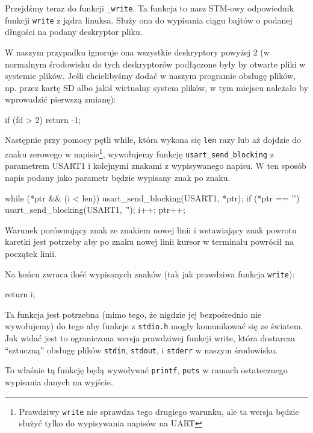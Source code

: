 \documentclass{pdfBooklets}
\begin{document}
Przejdźmy teraz do funkcji \Verb$_write$. Ta funkcja to nasz STM-owy odpowiednik funkcji \Verb$write$ z jądra linuksa. Służy ona do wypisania ciągu
bajtów o podanej długości na podany deskryptor pliku.

W naszym przypadku ignoruje ona wszystkie deskryptory powyżej 2 (w normalnym środowisku do tych deskryptorów podłączone były by otwarte pliki w systemie
plików. Jeśli chcielibyśmy dodać w naszym programie obsługę plików, np. przez kartę SD albo jakiś wirtualny system plików, w tym miejscu
należało by wprowadzić pierwszą zmianę):

\begin{CodeFrame*}[c]{}
  if (fd > 2) {
    return -1;
  }
\end{CodeFrame*}

Następnie przy pomocy pętli while, która wykona się \Verb$len$ razy lub aż dojdzie do znaku zerowego w napisie\footnote{Prawdziwy \Verb$write$ nie
  sprawdza tego drugiego warunku, ale ta wersja będzie służyć tylko do wypisywania napisów na UART}, wywołujemy funkcję \Verb$usart_send_blocking$
z parametrem USART1 i kolejnymi znakami z wypisywanego napisu. W ten sposób napis podany jako parametr będzie wypisany znak po znaku.

\begin{CodeFrame*}[c]{}
  while (*ptr && (i < len)) {
    usart_send_blocking(USART1, *ptr);
    if (*ptr == '\n') {
      usart_send_blocking(USART1, '\r');
    }
    i++; 
    ptr++;
  }
\end{CodeFrame*}

Warunek porównujący znak ze znakiem nowej linii i wstawiający znak powrotu karetki jest potrzeby aby po znaku nowej linii kursor w terminalu powrócił
na początek linii.

Na końcu zwraca ilość wypisanych znaków (tak jak prawdziwa funkcja \Verb$write$):

\begin{CodeFrame*}[c]{}
  return i;
\end{CodeFrame*}

Ta funkcja jest potrzebna (mimo tego, że nigdzie jej bezpośrednio nie wywołujemy) do tego aby funkcje z \Verb$stdio.h$ mogły komunikować się ze światem.
Jak widać jest to ograniczona wersja prawdziwej funkcji write, która dostarcza ``sztuczną'' obsługę plików \Verb$stdin$, \Verb$stdout$, i \Verb$stderr$
w naszym środowisku. 

To właśnie tą funkcję będą wywoływać \Verb$printf$, \Verb$puts$ w ramach ostatecznego wypisania danych na wyjście.
\\
\end{document}
